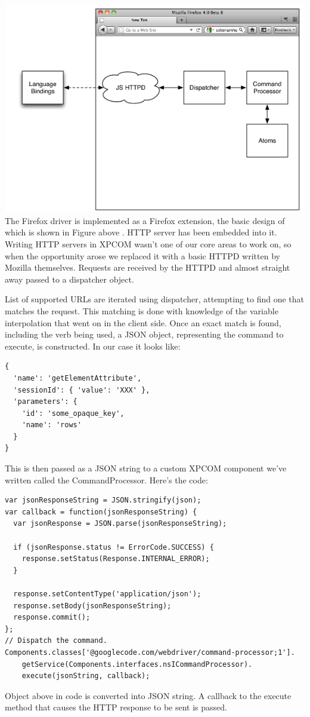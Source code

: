 \documentclass[12pt]{report}
\begin{document}
\includegraphics[scale=1]{FireFoxDriver}
The Firefox driver is implemented as a Firefox extension, the basic design of which is shown in Figure above . HTTP server has been embedded into it. Writing HTTP servers in XPCOM wasn't one of our core areas to work on, so when the opportunity arose we replaced it with a basic HTTPD written by Mozilla themselves. Requests are received by the HTTPD and almost straight away passed to a dispatcher object.

List of supported URLs are iterated  using dispatcher, attempting to find one that matches the request. This matching is done with knowledge of the variable interpolation that went on in the client side. Once an exact match is found, including the verb being used, a JSON object, representing the command to execute, is constructed. In our case it looks like:
\begin{verbatim}
{
  'name': 'getElementAttribute',
  'sessionId': { 'value': 'XXX' },
  'parameters': {
    'id': 'some_opaque_key',
    'name': 'rows'
  }
}

\end{verbatim}
This is then passed as a JSON string to a custom XPCOM component we've written called the CommandProcessor. Here's the code:
\begin{verbatim}
var jsonResponseString = JSON.stringify(json);
var callback = function(jsonResponseString) {
  var jsonResponse = JSON.parse(jsonResponseString);

  if (jsonResponse.status != ErrorCode.SUCCESS) {
    response.setStatus(Response.INTERNAL_ERROR);
  }

  response.setContentType('application/json');
  response.setBody(jsonResponseString);
  response.commit();
};
// Dispatch the command.
Components.classes['@googlecode.com/webdriver/command-processor;1'].
    getService(Components.interfaces.nsICommandProcessor).
    execute(jsonString, callback);

\end{verbatim}
Object above in code is converted into JSON string. A callback to the execute method that causes the HTTP response to be sent is passed.
\end{document}
